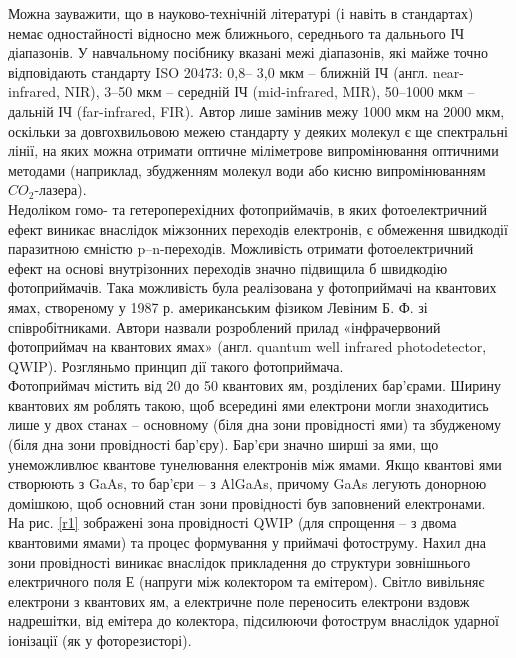 \documentclass[a4paper,14pt]{extreport}
\begin{document}
Можна зауважити, що в науково-технічній літературі (і навіть в
стандартах) немає одностайності відносно меж ближнього, середнього
та дальнього ІЧ діапазонів. У навчальному посібнику вказані межі
діапазонів, які майже точно відповідають стандарту ISO 20473: 0,8–
3,0 мкм – ближній ІЧ (англ. near-infrared, NIR), 3–50 мкм – середній ІЧ
(mid-infrared, MIR), 50–1000 мкм – дальній ІЧ (far-infrared, FIR). Автор
лише замінив межу 1000 мкм на 2000 мкм, оскільки за довгохвильовою
межею стандарту у деяких молекул є ще спектральні лінії, на яких
можна отримати оптичне міліметрове випромінювання оптичними
методами (наприклад, збудженням молекул води або кисню
випромінюванням $CO_2$-лазера). \\ 

Недоліком гомо- та гетероперехідних фотоприймачів, в яких
фотоелектричний ефект виникає внаслідок міжзонних переходів
електронів, є обмеження швидкодії паразитною ємністю p–n-переходів.
Можливість отримати фотоелектричний ефект на основі внутрізонних
переходів значно підвищила б швидкодію фотоприймачів. Така
можливість була реалізована у фотоприймачі на квантових ямах,
створеному у 1987 р. американським фізиком Левіним Б. Ф. зі
співробітниками. Автори назвали розроблений прилад
«інфрачервоний фотоприймач на квантових ямах» (англ. quantum well
infrared photodetector, QWIP). Розгляньмо принцип дії такого
фотоприймача.\\ 

Фотоприймач містить від 20 до 50 квантових ям, розділених
бар’єрами. Ширину квантових ям роблять такою, щоб всередині ями
електрони могли знаходитись лише у двох станах – основному (біля
дна зони провідності ями) та збудженому (біля дна зони провідності
бар’єру). Бар’єри значно ширші за ями, що унеможливлює квантове
тунелювання електронів між ямами. Якщо квантові ями створюють з
 GaAs, то бар’єри – з AlGaAs, причому GaAs легують донорною
домішкою, щоб основний стан зони провідності був заповнений
електронами.\\ 

На рис. \ref{r1}  зображені зона провідності QWIP (для спрощення – з
двома квантовими ямами) та процес формування у приймачі
фотоструму. Нахил дна зони провідності виникає внаслідок
прикладення до структури зовнішнього електричного поля Е (напруги
між колектором та емітером). Світло вивільняє електрони з квантових
ям, а електричне поле переносить електрони вздовж надрешітки, від
емітера до колектора, підсилюючи фотострум внаслідок ударної
іонізації (як у фоторезисторі).
\end{document}
